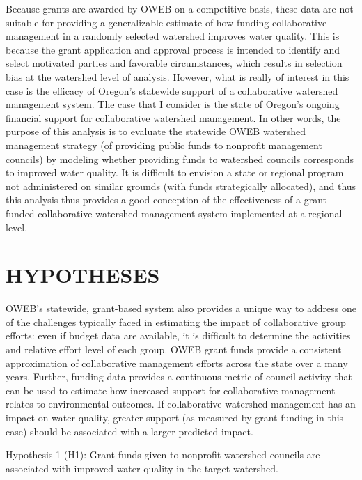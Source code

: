 \documentclass[12pt,a4paper,titlepage]{article}
\begin{document}
Because grants are awarded by OWEB on a competitive basis, these data are not suitable for providing a generalizable estimate of how funding collaborative management in a randomly selected watershed improves water quality. This is because the grant application and approval process is intended to identify and select motivated parties and favorable circumstances, which results in selection bias at the watershed level of analysis. However, what is really of interest in this case is the efficacy of Oregon's statewide support of a collaborative watershed management system. The case that I consider is the state of Oregon’s ongoing financial support for collaborative watershed management. In other words, the purpose of this analysis is to evaluate the statewide OWEB watershed management strategy (of providing public funds to nonprofit management councils) by modeling whether providing funds to watershed councils corresponds to improved water quality. It is difficult to envision a state or regional program not administered on similar grounds (with funds strategically allocated), and thus this analysis thus provides a good conception of the effectiveness of a grant-funded collaborative watershed management system implemented at a regional level.

\section*{\bf\MakeUppercase{Hypotheses}}

OWEB’s statewide, grant-based system also provides a unique way to address one of the challenges typically faced in estimating the impact of collaborative group efforts: even if budget data are available, it is difficult to determine the activities and relative effort level of each group. OWEB grant funds provide a consistent approximation of collaborative management efforts across the state over a many years. Further, funding data provides a continuous metric of council activity that can be used to estimate how increased support for collaborative management relates to environmental outcomes. If collaborative watershed management has an impact on water quality, greater support (as measured by grant funding in this case) should be associated with a larger predicted impact.

\begin{description}
\item{Hypothesis 1 (H1): Grant funds given to nonprofit watershed councils are associated with improved water quality in the target watershed.}
\end{description}
\end{document}
